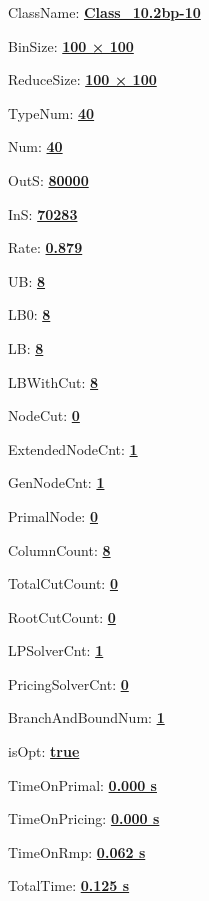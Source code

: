 \documentclass[11pt]{article}
\begin{document}
\pagestyle{empty}


ClassName: \underline{\textbf{Class_10.2bp-10}}
\par
BinSize: \underline{\textbf{100 × 100}}
\par
ReduceSize: \underline{\textbf{100 × 100}}
\par
TypeNum: \underline{\textbf{40}}
\par
Num: \underline{\textbf{40}}
\par
OutS: \underline{\textbf{80000}}
\par
InS: \underline{\textbf{70283}}
\par
Rate: \underline{\textbf{0.879}}
\par
UB: \underline{\textbf{8}}
\par
LB0: \underline{\textbf{8}}
\par
LB: \underline{\textbf{8}}
\par
LBWithCut: \underline{\textbf{8}}
\par
NodeCut: \underline{\textbf{0}}
\par
ExtendedNodeCnt: \underline{\textbf{1}}
\par
GenNodeCnt: \underline{\textbf{1}}
\par
PrimalNode: \underline{\textbf{0}}
\par
ColumnCount: \underline{\textbf{8}}
\par
TotalCutCount: \underline{\textbf{0}}
\par
RootCutCount: \underline{\textbf{0}}
\par
LPSolverCnt: \underline{\textbf{1}}
\par
PricingSolverCnt: \underline{\textbf{0}}
\par
BranchAndBoundNum: \underline{\textbf{1}}
\par
isOpt: \underline{\textbf{true}}
\par
TimeOnPrimal: \underline{\textbf{0.000 s}}
\par
TimeOnPricing: \underline{\textbf{0.000 s}}
\par
TimeOnRmp: \underline{\textbf{0.062 s}}
\par
TotalTime: \underline{\textbf{0.125 s}}
\par
\newpage


\end{document}
